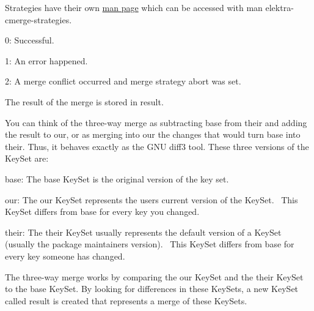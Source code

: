 Strategies have their own \hyperlink{doc_help_elektra-cmerge-strategy_md}{man page} which can be accessed with {\ttfamily man elektra-\/cmerge-\/strategies}.


\begin{DoxyItemize}
\item 0\+: Successful.
\item 1\+: An error happened.
\item 2\+: A merge conflict occurred and merge strategy abort was set.
\end{DoxyItemize}

The result of the merge is stored in {\ttfamily result}.

You can think of the three-\/way merge as subtracting base from their and adding the result to our, or as merging into our the changes that would turn base into their. Thus, it behaves exactly as the G\+NU diff3 tool. These three versions of the Key\+Set are\+:~\newline



\begin{DoxyItemize}
\item {\ttfamily base}\+: The {\ttfamily base} Key\+Set is the original version of the key set.~\newline

\item {\ttfamily our}\+: The {\ttfamily our} Key\+Set represents the user\textquotesingle{}s current version of the Key\+Set.~\newline
 This Key\+Set differs from {\ttfamily base} for every key you changed.~\newline

\item {\ttfamily their}\+: The {\ttfamily their} Key\+Set usually represents the default version of a Key\+Set (usually the package maintainer\textquotesingle{}s version).~\newline
 This Key\+Set differs from {\ttfamily base} for every key someone has changed.~\newline

\end{DoxyItemize}

The three-\/way merge works by comparing the {\ttfamily our} Key\+Set and the {\ttfamily their} Key\+Set to the {\ttfamily base} Key\+Set. By looking for differences in these Key\+Sets, a new Key\+Set called {\ttfamily result} is created that represents a merge of these Key\+Sets.~\newline


